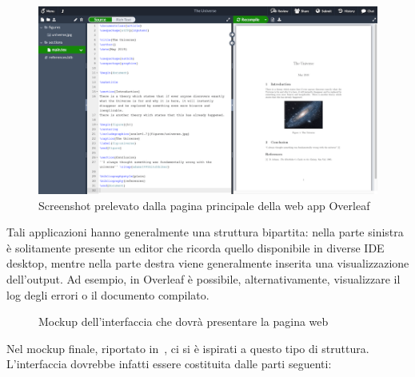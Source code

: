       \begin{figure}[htbp]
        \centering
        \includegraphics[width=.85\textwidth]{res/fig/overleaf.png}%
        \caption{Screenshot prelevato dalla pagina principale della web app Overleaf}%
        \label{fig:overleaf}
      \end{figure}

      Tali applicazioni hanno generalmente una struttura bipartita:
      nella parte sinistra è solitamente presente un editor che ricorda quello disponibile in diverse IDE desktop, mentre nella parte destra viene generalmente inserita una visualizzazione dell'output.
      Ad esempio, in Overleaf è possibile, alternativamente, visualizzare il log degli errori o il documento compilato.

      \begin{figure}[htbp]
        \centering
        \caption{Mockup dell'interfaccia che dovrà presentare la pagina web}%
        \label{fig:mockup}
      \end{figure}

      Nel mockup finale, riportato in~, ci si è ispirati a questo tipo di struttura.
      L'interfaccia dovrebbe infatti essere costituita dalle parti seguenti:

